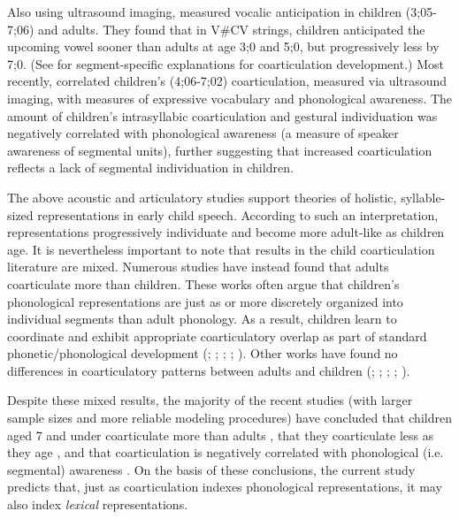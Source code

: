 \documentclass[a4paper,man,floatsintext,natbib,donotrepeattitle, apacite]{apa6}
\begin{document}
Also using ultrasound imaging, \citet{noirayBackFutureNonlinear2019} measured vocalic anticipation in children (3;05-7;06) and adults. They found that in V\#CV strings, children anticipated the upcoming vowel sooner than adults at age 3;0 and 5;0, but progressively less by 7;0. (See \citealt{noirayHowChildrenOrganize2018} for segment-specific explanations for coarticulation development.) Most recently, \citet{noiraySpokenLanguageDevelopment2019} correlated children's (4;06-7;02) coarticulation, measured via ultrasound imaging, with measures of expressive vocabulary and phonological awareness. The amount of children's intrasyllabic coarticulation and gestural individuation was negatively correlated with phonological awareness (a measure of speaker awareness of segmental units), further suggesting that increased coarticulation reflects a lack of segmental individuation in children. 

The above acoustic and articulatory studies support theories of holistic, syllable-sized representations in early child speech. According to such an interpretation, representations progressively individuate and become more adult-like as children age. It is nevertheless important to note that results in the child coarticulation literature are mixed. Numerous studies have instead found that adults coarticulate more than children. These works often argue that children's phonological representations are just as or more discretely organized into individual segments than adult phonology. As a result, children learn to coordinate and exhibit appropriate coarticulatory overlap as part of standard phonetic/phonological development (\citealt{barbierSpeechPlanningIndex2013}; \citealt{barbierSpeechPlanning4yearold2015}; \citealt{katzAnticipatoryCoarticulationSpeech1991}; \citealt{kentSegmentalOrganizationSpeech1983}; \citealt{whitesideSpeechPatternsChildren2000}). Other works have found no differences in coarticulatory patterns between adults and children (\citealt{flegeAnticipatoryCarryoverNasal1988}; \citealt{goffmanBreadthCoarticulatoryUnits2008}; \citealt{noirayDevelopmentMotorSynergies2013}; \citealt{serenoDevelopmentalAspectsLingual1987}; \citealt{serenoAcousticAnalysesPerceptual1987}).

Despite these mixed results, the majority of the recent studies (with larger sample sizes and more reliable modeling procedures) have concluded that children aged 7 and under coarticulate more than adults \citep{zharkovaCoarticulationIndicatorSpeech2011}, that they coarticulate less as they age \citep{noirayHowChildrenOrganize2018}, and that coarticulation is negatively correlated with phonological (i.e. segmental) awareness \citep{noirayBackFutureNonlinear2019}. On the basis of these conclusions, the current study predicts that, just as coarticulation indexes phonological representations, it may also index \textit{lexical} representations. 
\end{document}
